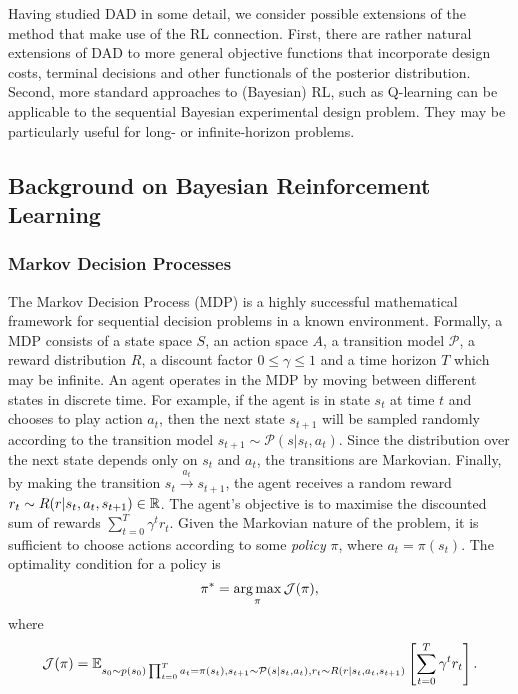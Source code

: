 \documentclass[a4paper, 10pt]{report}
\theoremstyle{plain}
\begin{document}
	Having studied DAD in some detail, we consider possible extensions of the method that make use of the RL connection.
	First, there are rather natural extensions of DAD to more general objective functions that incorporate design costs, terminal decisions and other functionals of the posterior distribution.
	Second, more standard approaches to (Bayesian) RL, such as Q-learning \citep{watkins1992q,dearden1998bayesian} can be applicable to the sequential Bayesian experimental design problem. They may be particularly useful for long- or infinite-horizon problems.
	
	
	\subsection{Background on Bayesian Reinforcement Learning}
	\subsubsection{Markov Decision Processes}
	The Markov Decision Process (MDP) \citep{bellman1957markovian,duff2002optimal} is a highly successful mathematical framework for sequential decision problems in a known environment.
	Formally, a MDP consists of a state space $S$, an action space $A$, a transition model $\mathcal{P}$, a reward distribution $R$, a discount factor $0 \le \gamma \le 1$ and a time horizon $T$ which may be infinite.
	An agent operates in the MDP by moving between different states in discrete time.
	For example, if the agent is in state $s_t$ at time $t$ and chooses to play action $a_t$, then the next state $s_{t+1}$ will be sampled randomly according to the transition model $s_{t+1} \sim \mathcal{P}(s|s_t,a_t)$. Since the distribution over the next state depends only on $s_t$ and $a_t$, the transitions are Markovian.
	Finally, by making the transition $s_t \overset{a_{t}}{\longrightarrow} s_{t+1}$, the agent receives a random reward $r_t \sim R(r|s_t,a_t,s_{t+1}) \in \mathbb{R}$.
	The agent's objective is to maximise the discounted sum of rewards $\sum_{t=0}^T \gamma^t r_t$.
	Given the Markovian nature of the problem, it is sufficient to choose actions according to some \emph{policy} $\pi$, where $a_t = \pi(s_t)$.
	The optimality condition for a policy is
	\begin{equation}
	\pi^* = \operatorname*{arg\,max}_{\pi} \mathcal{J}(\pi),
	\end{equation}
	where
	\begin{equation}
	\mathcal{J}(\pi) = \mathbb{E}_{ s_0\sim p(s_0) \prod_{t=0}^T a_t=\pi(s_t), s_{t+1}\sim \mathcal{P}(s|s_t,a_t), r_t \sim R(r|s_t,a_t,s_{t+1}) }\left[ \sum_{t=0}^T \gamma^t r_t \right].
	\end{equation}
\end{document}
